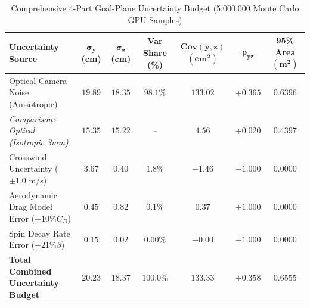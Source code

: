 \begin{table}[htbp]
\centering
\caption{Comprehensive 4-Part Goal-Plane Uncertainty Budget (5,000,000 Monte Carlo GPU Samples)}
\label{tab:uncertainty_budget}
\begin{tabular}{lcccccc}
\toprule
\textbf{Uncertainty Source} & $\mathbf{\sigma_y}$ \textbf{(cm)} & $\mathbf{\sigma_z}$ \textbf{(cm)} & \textbf{Var Share (\%)} & $\mathbf{\text{Cov}(y,z)}$ $\mathbf{(\text{cm}^2)}$ & $\mathbf{\rho_{yz}}$ & \textbf{95\% Area} $\mathbf{(\text{m}^2)}$ \\
\midrule
Optical Camera Noise (Anisotropic) & $19.89$ & $18.35$ & $98.1\%$ & $133.02$ & $+0.365$ & $0.6396$ \\
\quad \textit{Comparison: Optical (Isotropic 3mm)} & $15.35$ & $15.22$ & \textit{--} & $4.56$ & $+0.020$ & $0.4397$ \\
Crosswind Uncertainty ($\pm 1.0\text{ m/s}$) & $3.67$ & $0.40$ & $1.8\%$ & $-1.46$ & $-1.000$ & $0.0000$ \\
Aerodynamic Drag Model Error ($\pm 10\% C_D$) & $0.45$ & $0.82$ & $0.1\%$ & $0.37$ & $+1.000$ & $0.0000$ \\
Spin Decay Rate Error ($\pm 21\% \beta$) & $0.15$ & $0.02$ & $0.00\%$ & $-0.00$ & $-1.000$ & $0.0000$ \\
\midrule
\textbf{Total Combined Uncertainty Budget} & $\mathbf{20.23}$ & $\mathbf{18.37}$ & $\mathbf{100.0\%}$ & $\mathbf{133.33}$ & $\mathbf{+0.358}$ & $\mathbf{0.6555}$ \\
\bottomrule
\end{tabular}
\end{table}
